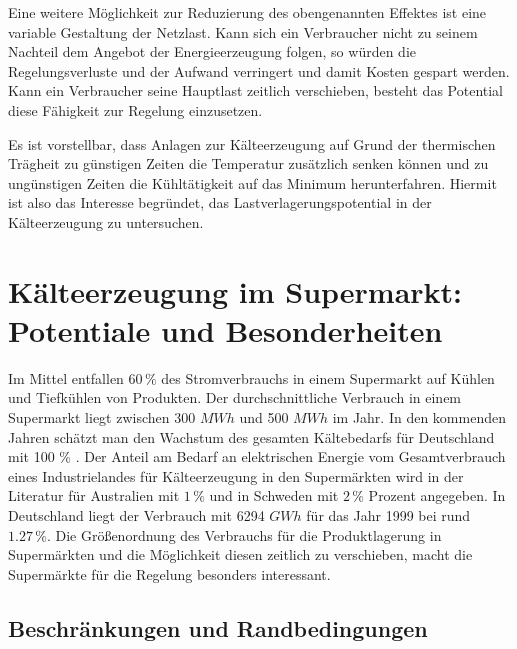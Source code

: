 Eine weitere M\"oglichkeit zur Reduzierung des obengenannten Effektes ist eine
variable Gestaltung der Netzlast. Kann sich ein Verbraucher nicht zu seinem
Nachteil dem Angebot der Energieerzeugung folgen, so würden die
Regelungsverluste und der Aufwand verringert und damit Kosten gespart werden.
Kann ein Verbraucher seine Hauptlast zeitlich verschieben, besteht das Potential
diese F\"ahigkeit zur Regelung einzusetzen.

Es ist vorstellbar, dass Anlagen zur K\"alteerzeugung auf Grund der thermischen
Tr\"agheit zu g\"unstigen Zeiten die Temperatur zus\"atzlich senken k\"onnen und
zu ung\"unstigen Zeiten die K\"uhlt\"atigkeit auf das Minimum herunterfahren.
Hiermit ist also das Interesse begr\"undet, das Lastverlagerungspotential in der
K\"alteerzeugung zu untersuchen.


\section{K\"alteerzeugung im Supermarkt: Potentiale und Besonderheiten}

Im Mittel entfallen $60\, \%$\cite{leghart, EANRW} des Stromverbrauchs in einem
Supermarkt auf Kühlen und Tiefkühlen von Produkten. Der durchschnittliche
Verbrauch in einem Supermarkt liegt zwischen 300 $MWh$ und 500 $MWh$ im
Jahr\cite{leghart}. In den kommenden Jahren sch\"atzt man den Wachstum des
gesamten K\"altebedarfs f\"ur Deutschland mit 100 \% \cite{probst}. Der Anteil
am Bedarf an elektrischen Energie vom Gesamtverbrauch eines Industrielandes für
Kälteerzeugung in den Supermärkten wird in der Literatur f\"ur  Australien mit
$1\, \%$ \cite{australia} und in Schweden mit $2\, \%$ \cite{doctor, EANRW}
Prozent angegeben. In Deutschland liegt der Verbrauch mit 6294 $GWh$ f\"ur das
Jahr 1999 bei rund $1.27\, \%$\cite{steilme}. Die Gr\"o\ss enordnung des
Verbrauchs f\"ur die Produktlagerung in Superm\"arkten und die M\"oglichkeit
diesen zeitlich zu verschieben, macht die Superm\"arkte f\"ur die Regelung
besonders interessant.


\subsection*{Beschr\"ankungen und Randbedingungen}

